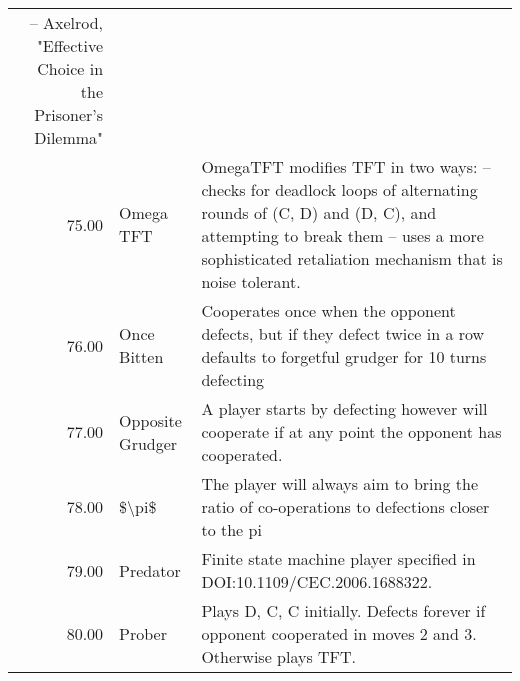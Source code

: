 \begin{table}[!hbtp]
\begin{adjustbox}{width=2\textwidth, angle=90}
\begin{tabular}{rll}
	-- Axelrod, "Effective Choice in the Prisoner's Dilemma" \\
	75.00  & Omega TFT                   & OmegaTFT modifies TFT in two ways:
	-- checks for deadlock loops of alternating rounds of (C, D) and (D, C),
	and attempting to break them
	-- uses a more sophisticated retaliation mechanism that is noise tolerant.                                                                                                                                                                                                                                                                                                                                                                                                                                                                                                                                                                                                                                                                                                                                                                                 \\
	76.00  & Once Bitten                 & Cooperates once when the opponent defects, but if they defect twice in a row defaults to forgetful grudger for 10 turns defecting \\
	77.00  & Opposite Grudger            & A player starts by defecting however will cooperate if at any point the opponent has cooperated.                                  \\
	78.00  & \$\textbackslash{}pi\$      & The player will always aim to bring the ratio of co-operations to defections closer to the pi                                     \\
	79.00  & Predator                    & Finite state machine player specified in DOI:10.1109/CEC.2006.1688322.                                                            \\
	80.00  & Prober                      & Plays D, C, C initially. Defects forever if opponent cooperated in moves 2
	and 3. Otherwise plays TFT.                                                                                                                                                                                                                                                                                                                                                                                                                                                                                                                                                                                                                                                                                                                                                                                                                                                                                                               \\

\end{tabular}
\end{adjustbox}
\end{table}
